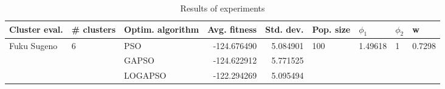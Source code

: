 \begin{table}
\centering
\caption{Results of experiments}
\begin{tabular}{lllrrllll}
\toprule
               Cluster eval. &        \# clusters & Optim. algorithm &  Avg. fitness &  Std. dev. &            Pop. size &               $\phi_{1}$ &         $\phi_{2}$ &                       w \\
\midrule
\multirow{3}{*}{Fuku Sugeno} & \multirow{3}{*}{6} &              PSO &   -124.676490 &   5.084901 & \multirow{3}{*}{100} & \multirow{3}{*}{1.49618} & \multirow{3}{*}{1} & \multirow{3}{*}{0.7298} \\
                             &                    &            GAPSO &   -124.622912 &   5.771525 &                      &                          &                    &                         \\
                             &                    &          LOGAPSO &   -122.294269 &   5.095494 &                      &                          &                    &                         \\
\bottomrule
\end{tabular}
\end{table}

